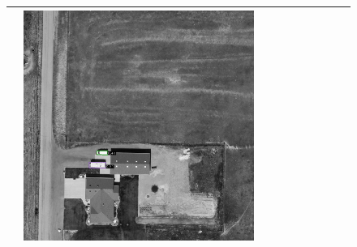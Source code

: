 \begin{figure}[h!]
\begin{tabularx}{\textwidth}{c|*{9}{X}}
    & \includegraphics[trim={300pt 355pt 610pt 570pt},clip,width=\linewidth]{images/015Results/03ablation/comp_images/red/198.png} \\ \hline


\end{tabularx}
\end{figure}
